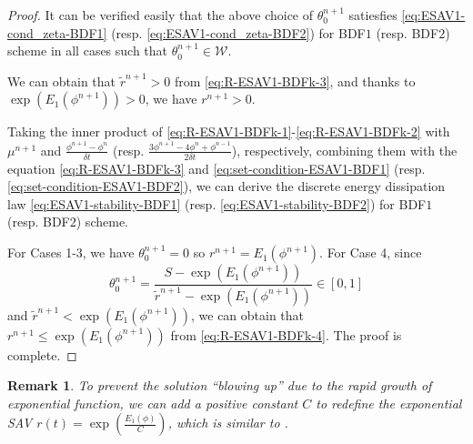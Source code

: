 \documentclass[final,review,onefignum,onetabnum]{siamart190516}
\theoremstyle{plain}
\newtheorem{remark}{\textbf{Remark}}[section]
\begin{document}
\begin{proof}
It can be verified easily that the above choice of $\theta_{0}^{n+1}$ satiesfies \eqref{eq:ESAV1-cond_zeta-BDF1} (resp. \eqref{eq:ESAV1-cond_zeta-BDF2}) for BDF$1$ (resp. BDF$2$) scheme in all cases such that $\theta_0^{n+1}\in \mathcal{W}$.

We can obtain that $\tilde r^{n+1} > 0$  from \eqref{eq:R-ESAV1-BDFk-3}, and thanks to $\exp\left(E_{1}(\phi^{n+1})\right)>0$, we have $r^{n+1}>0$.

Taking the inner product of \eqref{eq:R-ESAV1-BDFk-1}-\eqref{eq:R-ESAV1-BDFk-2} with $\mu^{n+1}$ and $\frac{\phi^{n+1}-\phi^{n}}{\delta t}$ (resp. $\frac{3 \phi^{n+1}-4\phi^{n}+\phi^{n-1}}{2\delta t}$), respectively, combining them with the equation \eqref{eq:R-ESAV1-BDFk-3} and \eqref{eq:set-condition-ESAV1-BDF1} (resp. \eqref{eq:set-condition-ESAV1-BDF2}), we can derive the discrete energy dissipation law \eqref{eq:ESAV1-stability-BDF1} (resp. \eqref{eq:ESAV1-stability-BDF2}) for BDF$1$ (resp. BDF$2$) scheme. 

For Cases 1-3,  we have $\theta_0^{n+1}=0$ so $r^{n+1}= E_{1}(\phi^{n+1})$. 
For Case 4, since 
$$\theta_{0}^{n+1}=\frac{S-\exp\left(E_{1}(\phi^{n+1})\right)}{\tilde{r}^{n+1}-\exp\left(E_{1}(\phi^{n+1})\right)}\in [0,1]$$ and $\tilde r^{n+1}<  \exp\left(E_{1}(\phi^{n+1})\right)$, we can obtain that $r^{n+1}\le \exp\left(E_{1}(\phi^{n+1})\right)$ from \eqref{eq:R-ESAV1-BDFk-4}. 
The proof is complete.
\end{proof}

\begin{remark}
 	To prevent the solution ``blowing up'' due to the rapid growth of exponential function, we can add a positive constant $C$ to redefine the exponential SAV $r(t) = \exp\left(\frac{E_{1}(\phi)}{C}\right)$, which is similar to \cite{liu2020exponential}. 
\end{remark}



\end{document}
